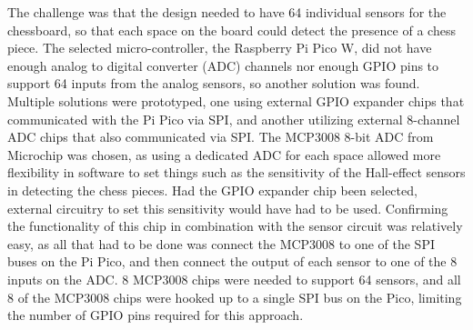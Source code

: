 \documentclass[11pt,journal]{IEEEtran}
\begin{document}
The challenge was that the design needed to have 64 individual sensors for the chessboard, so that each space on the board could detect the presence of a chess piece. The selected micro-controller, the Raspberry Pi Pico W, did not have enough analog to digital converter (ADC) channels nor enough GPIO pins to support 64 inputs from the analog sensors, so another solution was found. Multiple solutions were prototyped, one using external GPIO expander chips that communicated with the Pi Pico via SPI, and another utilizing external 8-channel ADC chips that also communicated via SPI. The MCP3008 8-bit ADC from Microchip was chosen, as using a dedicated ADC for each space allowed more flexibility in software to set things such as the sensitivity of the Hall-effect sensors in detecting the chess pieces. Had the GPIO expander chip been selected, external circuitry to set this sensitivity would have had to be used. Confirming the functionality of this chip in combination with the sensor circuit was relatively easy, as all that had to be done was connect the MCP3008 to one of the SPI buses on the Pi Pico, and then connect the output of each sensor to one of the 8 inputs on the ADC. 8 MCP3008 chips were needed to support 64 sensors, and all 8 of the MCP3008 chips were hooked up to a single SPI bus on the Pico, limiting the number of GPIO pins required for this approach.
\end{document}
